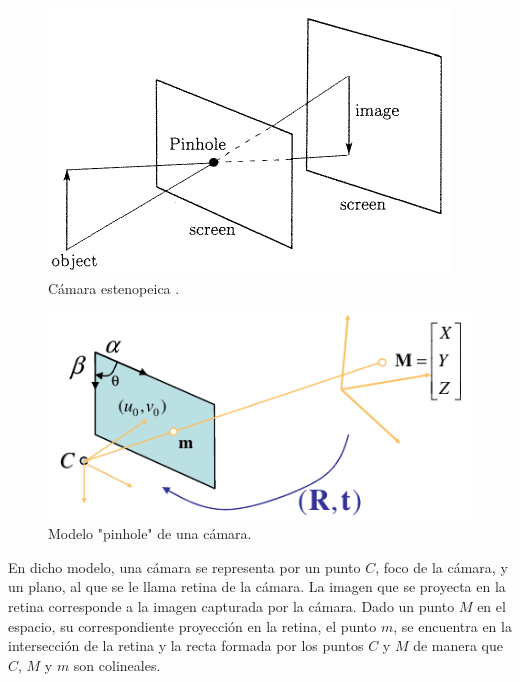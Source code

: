 \begin{figure}[h!]
\begin{center}
\includegraphics[scale=0.5]{img/calibracion/pinhole_camara.png}
\end{center}
\caption{Cámara estenopeica .\cite{faugeras_libro}}
\label{pinhole_camara}
\end{figure}



\begin{figure}[ht]
\begin{center}
\includegraphics[scale=0.7]{img/calibracion/pinhole_modelo.png}
\end{center}
\caption{Modelo "pinhole" de una cámara.\cite{zhang_libro}}
\label{pinhole_modelo}
\end{figure}

En dicho modelo, una cámara se representa por un punto $C$, foco de la cámara, y un plano, al  que se le llama retina de la cámara. La imagen que se proyecta en la retina corresponde a la imagen capturada por la cámara. Dado un punto $M$ en el espacio, su correspondiente proyección en la retina, el punto $m$, se encuentra en la intersección de la retina y la recta formada por los puntos $C$ y $M$ de manera que $C$, $M$ y $m$ son colineales.\\ 




